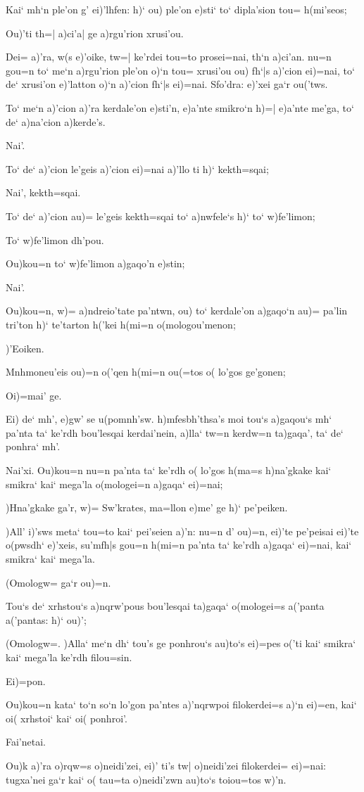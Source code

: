 \documentclass[11pt]{book}
\newcommand {\Spag} {\Npag*{=+1}\Npar{1}\numerus{1}}
\newcommand {\Spar} {\Npar*{=+1}\numerus{1}}
\begin{document}
\1 Kai` mh`n ple'on g' ei)'lhfen: h)` ou) ple'on e)sti` to` dipla'sion tou=
h(mi'seos;

\2 Ou)'ti th=| a)ci'a| ge a)rgu'rion xrusi'ou.

\1 Dei= a)'ra, w(s e)'oike, tw=| ke'rdei tou=to prosei=nai, th`n a)ci'an. nu=n
gou=n to` me`n a)rgu'rion ple'on o)`n tou= xrusi'ou ou) fh`|s a)'cion ei)=nai,
to` de` xrusi'on e)'latton o)`n a)'cion fh`|s ei)=nai.
\2 \Spar Sfo'dra: e)'xei ga`r ou('tws.

\1 To` me`n a)'cion a)'ra kerdale'on e)sti'n, e)a'nte smikro`n h)=| e)a'nte
me'ga, to` de` a)na'cion a)kerde's.

\2 Nai'.

\1 To` de` a)'cion le'geis a)'cion ei)=nai a)'llo ti h)` kekth=sqai;

\2 Nai', kekth=sqai.

\1 To` de` a)'cion au)= le'geis kekth=sqai to` a)nwfele`s h)` to` w)fe'limon;

\2 To` w)fe'limon dh'pou.

\1 \Spag Ou)kou=n to` w)fe'limon a)gaqo'n e)stin;

\2 Nai'.

\1 Ou)kou=n, w)= a)ndreio'tate pa'ntwn, ou) to` kerdale'on a)gaqo`n au)= pa'lin
tri'ton h)` te'tarton h('kei h(mi=n o(mologou'menon;

\2 )'Eoiken.

\1 Mnhmoneu'eis ou)=n o('qen h(mi=n ou(=tos o( lo'gos ge'gonen;

\2 Oi)=mai' ge.

\1 Ei) de` mh', e)gw' se u(pomnh'sw. h)mfesbh'thsa's moi tou`s a)gaqou`s mh`
pa'nta ta` ke'rdh bou'lesqai kerdai'nein, a)lla` tw=n kerdw=n ta)gaqa', ta`
de` ponhra` mh'.

\2 Nai'xi.
\Spar %
\1 Ou)kou=n nu=n pa'nta ta` ke'rdh o( lo'gos h(ma=s h)na'gkake kai` smikra` kai`
mega'la o(mologei=n a)gaqa` ei)=nai;

\2 )Hna'gkake ga'r, w)= Sw'krates, ma=llon e)me' ge h)` pe'peiken.

\1 )All' i)'sws meta` tou=to kai` pei'seien a)'n: nu=n d' ou)=n, ei)'te
pe'peisai ei)'te o(pwsdh` e)'xeis, su'mfh|s gou=n h(mi=n pa'nta ta` ke'rdh
a)gaqa` ei)=nai, kai` smikra` kai` mega'la.

\2 (Omologw= ga`r ou)=n.

\1 Tou`s de` xrhstou`s a)nqrw'pous bou'lesqai ta)gaqa` o(mologei=s a('panta
a('pantas: h)` ou)';

\2 (Omologw=.
\1 \Spar )Alla` me`n dh` tou's ge ponhrou`s au)to`s ei)=pes o('ti kai` smikra` kai`
mega'la ke'rdh filou=sin.

\2 Ei)=pon.

\1 Ou)kou=n kata` to`n so`n lo'gon pa'ntes a)'nqrwpoi filokerdei=s a)`n ei)=en,
kai` oi( xrhstoi` kai` oi( ponhroi'.

\2 Fai'netai.

\1 Ou)k a)'ra o)rqw=s o)neidi'zei, ei)' ti's tw| o)neidi'zei filokerdei=
ei)=nai: tugxa'nei ga`r kai` o( tau=ta o)neidi'zwn au)to`s toiou=tos w)'n. 

\endprosa
\enddrama
\end{document}
